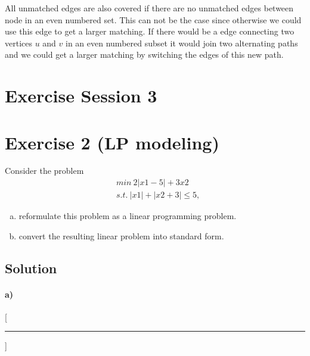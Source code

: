 \documentclass[a4paper, 12pt]{report}
\begin{document}
All unmatched edges are also covered if there are no unmatched edges between
node in an even numbered set. This can not be the case since otherwise we could
use this edge to get a larger matching. If there would be a edge connecting two
vertices $u$ and $v$ in an even numbered subset it would join two alternating
paths and we could get a larger matching by switching the edges of this new
path.

\section{Exercise Session 3}

\section{Exercise 2 (LP modeling)}

Consider the problem
\begin{align*}
    & min~  2|x1 − 5| + 3x2\\
    & s.t.~ |x1| + |x2 + 3| ≤ 5,
\end{align*}

\begin{enumerate}[a)]
    \item reformulate this problem as a linear programming problem.
    \item convert the resulting linear problem into standard form.
\end{enumerate}

\subsection{Solution}

\paragraph{a)}


\newpage
\titleformat{\chapter}{\sffamily\bfseries}{}{0pt}{}[{\color{aqua}\hrule}]
\printbibliography
\end{document}
